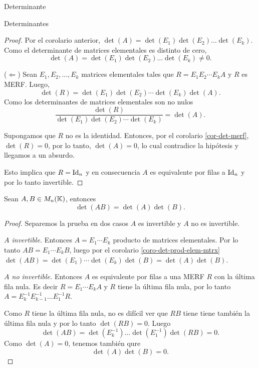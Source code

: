 \begin{chapter}{Determinante}
\begin{section}{Determinantes}
\begin{proof}
            Por el corolario anterior,  $\det(A) = \det(E_1) \det(E_2) \ldots \det(E_k)$. Como el determinante de matrices elementales es distinto de cero, $$\det(A) = \det(E_1) \det(E_2) \ldots \det(E_k)\ne 0.$$
    
            ($\Leftarrow$) Sean $E_1, E_2, \ldots, E_k$ matrices elementales tales que $R = E_1 E_2 \cdots E_k A$ y $R$ es MERF. Luego,
            \begin{equation*}
                \det(R) = \det(E_1) \det(E_2) \cdots \det(E_k) \det(A). 
            \end{equation*}
            Como los determinantes de matrices  elementales son no nulos
            \begin{equation*}
                \frac{\det(R)}{\det(E_1) \det(E_2) \cdots \det(E_k) } = \det(A). \tag{*}
            \end{equation*}
        
            
            Supongamos que $R$ no es la identidad.  Entonces, por el corolario \ref{cor-det-merf}, $\det(R) =0$,  por lo tanto, $\det(A)=0$, lo cual contradice la hipótesis y llegamos a un absurdo. 
        
            Esto implica que  $R= \operatorname{Id}_n$ y en consecuencia  $A$ es equivalente por filas a $\operatorname{Id}_n$ y por lo tanto  invertible.
        \end{proof}
    
        \begin{teorema}\label{th-dem-detAB}  Sean $A,B \in M_n(\mathbb K)$,  entonces
        $$\det (A B) = \det(A)\det(B).$$
        \end{teorema}
        \begin{proof} Separemos la prueba en dos casos  $A$ es invertible  y  $A$ no es invertible.

            \textit{$A$ invertible.} Entonces $A= E_1\cdots E_k$ producto de matrices elementales. Por lo tanto  $AB =  E_1\cdots E_kB$, luego por el corolario \ref{coro-det-prod-elem-mtrx}  $\det(AB) =  \det(E_1)\cdots \det(E_k)\det(B) = \det(A)\det(B)$. 
            
            \textit{$A$ no invertible.}  Entonces $A$  es equivalente por filas a una MERF $R$ con la última fila nula. Es decir $R =E_1\cdots E_kA$ y $R$ tiene la última fila nula, por  lo tanto $A=  E_k^{-1}E_{k-1}^{-1}\ldots E_1^{-1}R$. 
            
            Como $R$ tiene la última fila nula, no es difícil ver que  $RB$ tiene tiene también la última fila nula y por lo tanto $\det(RB)=0$. Luego 
            $$
            \det(AB) = \det( E_k^{-1}) \ldots \det(E_1^{-1})\det(RB) =0.
            $$
            Como  $\det(A)=0$, tenemos también qure 
            $$
            \det(A)\det(B) =0.
            $$  
        \end{proof}


\end{section}
\end{chapter}
